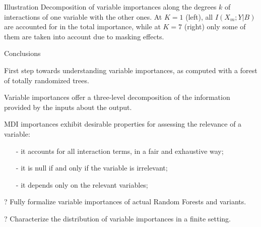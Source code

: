 \documentclass[final]{beamer}
\newcommand{\cmark}{\ding{51}}%
\begin{document}
\begin{frame}{}
\begin{textblock}{0.32}
\begin{block}{Illustration \phantom{p}}
Decomposition of variable importances along the
degrees $k$ of interactions of one variable with the other ones. At $K=1$ (left), all
$I(X_m;Y|B)$ are accounted for in the total importance, while at $K=7$ (right) only
some of them are taken into account due to masking effects.

\end{block}

\begin{block}{Conclusions \phantom{p}}

{\color{green} \cmark} First step towards understanding variable importances, as computed with a forest of totally randomized trees.

{\color{green} \cmark} Variable importances offer a three-level decomposition of the information provided by the inputs about the output.

{\color{green} \cmark} MDI importances exhibit desirable properties for assessing the relevance of a variable:
\begin{itemize}
\item[-] it accounts for all interaction terms, in a fair and exhaustive way;
\item[-] it is null if and only if the variable is irrelevant;
\item[-] it depends only on the relevant variables;
\end{itemize}

{\color{blue} ?} Fully formalize variable importances of actual Random Forests and variants.

{\color{blue} ?} Characterize the distribution of variable importances in a finite setting.


\end{block}

\end{textblock}




\end{frame}
\end{document}
